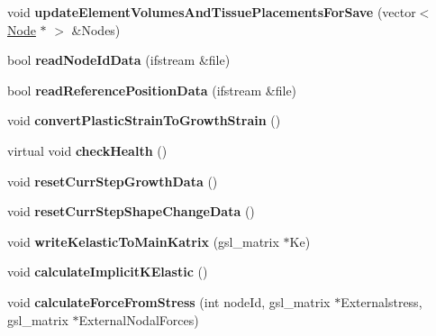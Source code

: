 \begin{DoxyCompactItemize}
\item 
\hypertarget{classShapeBase_a6e36c21c648f06a0e0693b3c34472fe5}{}void {\bfseries update\+Element\+Volumes\+And\+Tissue\+Placements\+For\+Save} (vector$<$ \hyperlink{classNode}{Node} $\ast$ $>$ \&Nodes)\label{classShapeBase_a6e36c21c648f06a0e0693b3c34472fe5}

\item 
\hypertarget{classShapeBase_acbd21b1daca4a94c5919147ae8c463d6}{}bool {\bfseries read\+Node\+Id\+Data} (ifstream \&file)\label{classShapeBase_acbd21b1daca4a94c5919147ae8c463d6}

\item 
\hypertarget{classShapeBase_a37a16216b042486dfdcbb16d8366eb7f}{}bool {\bfseries read\+Reference\+Position\+Data} (ifstream \&file)\label{classShapeBase_a37a16216b042486dfdcbb16d8366eb7f}

\item 
\hypertarget{classShapeBase_a78d45ea18373ce5e21b7567e9e6bdabc}{}void {\bfseries convert\+Plastic\+Strain\+To\+Growth\+Strain} ()\label{classShapeBase_a78d45ea18373ce5e21b7567e9e6bdabc}

\item 
\hypertarget{classShapeBase_adb6927dd05e3f6aa1c5ac5d32a30b5da}{}virtual void {\bfseries check\+Health} ()\label{classShapeBase_adb6927dd05e3f6aa1c5ac5d32a30b5da}

\item 
\hypertarget{classShapeBase_a35a4fb8458adc80435e11da10cb6627b}{}void {\bfseries reset\+Curr\+Step\+Growth\+Data} ()\label{classShapeBase_a35a4fb8458adc80435e11da10cb6627b}

\item 
\hypertarget{classShapeBase_a3c08833714950163efbf15f9b1c26765}{}void {\bfseries reset\+Curr\+Step\+Shape\+Change\+Data} ()\label{classShapeBase_a3c08833714950163efbf15f9b1c26765}

\item 
\hypertarget{classShapeBase_af6cd6e943b529eca33c92723893bf991}{}void {\bfseries write\+Kelastic\+To\+Main\+Katrix} (gsl\+\_\+matrix $\ast$Ke)\label{classShapeBase_af6cd6e943b529eca33c92723893bf991}

\item 
\hypertarget{classShapeBase_a922c41864d4826725cc72089046f818c}{}void {\bfseries calculate\+Implicit\+K\+Elastic} ()\label{classShapeBase_a922c41864d4826725cc72089046f818c}

\item 
\hypertarget{classShapeBase_a6a9f16ddb320974584323d78ca4aec9c}{}void {\bfseries calculate\+Force\+From\+Stress} (int node\+Id, gsl\+\_\+matrix $\ast$Externalstress, gsl\+\_\+matrix $\ast$External\+Nodal\+Forces)\label{classShapeBase_a6a9f16ddb320974584323d78ca4aec9c}


\end{DoxyCompactItemize}
